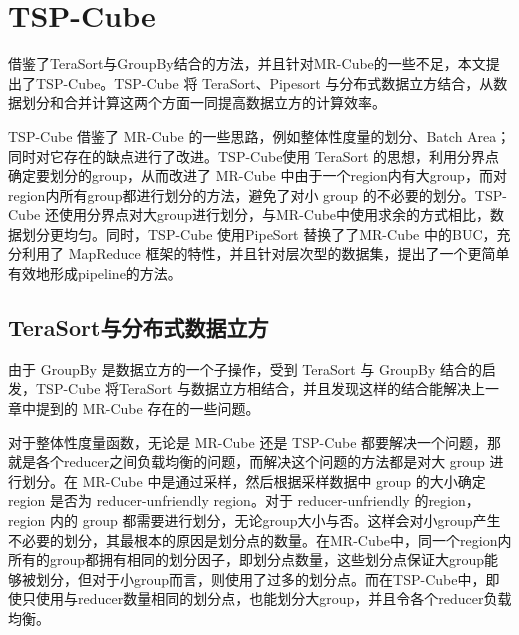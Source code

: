\section{TSP-Cube}

借鉴了TeraSort与GroupBy结合的方法，并且针对MR-Cube的一些不足，本文提出了TSP-Cube。TSP-Cube 将 TeraSort、Pipesort 与分布式数据立方结合，从数据划分和合并计算这两个方面一同提高数据立方的计算效率。

TSP-Cube 借鉴了 MR-Cube 的一些思路，例如整体性度量的划分、Batch Area；同时对它存在的缺点进行了改进。TSP-Cube使用 TeraSort 的思想，利用分界点确定要划分的group，从而改进了 MR-Cube 中由于一个region内有大group，而对region内所有group都进行划分的方法，避免了对小 group 的不必要的划分。TSP-Cube 还使用分界点对大group进行划分，与MR-Cube中使用求余的方式相比，数据划分更均匀。同时，TSP-Cube 使用PipeSort 替换了了MR-Cube 中的BUC，充分利用了 MapReduce 框架的特性，并且针对层次型的数据集，提出了一个更简单有效地形成pipeline的方法。

\subsection{TeraSort与分布式数据立方}


由于 GroupBy 是数据立方的一个子操作，受到 TeraSort 与 GroupBy 结合的启发，TSP-Cube 将TeraSort 与数据立方相结合，并且发现这样的结合能解决上一章中提到的 MR-Cube 存在的一些问题。



对于整体性度量函数，无论是 MR-Cube 还是 TSP-Cube 都要解决一个问题，那就是各个reducer之间负载均衡的问题，而解决这个问题的方法都是对大 group 进行划分。在 MR-Cube 中是通过采样，然后根据采样数据中 group 的大小确定 region 是否为 reducer-unfriendly region。对于 reducer-unfriendly 的region，region 内的 group 都需要进行划分，无论group大小与否。这样会对小group产生不必要的划分，其最根本的原因是划分点的数量。在MR-Cube中，同一个region内所有的group都拥有相同的划分因子，即划分点数量，这些划分点保证大group能够被划分，但对于小group而言，则使用了过多的划分点。而在TSP-Cube中，即使只使用与reducer数量相同的划分点，也能划分大group，并且令各个reducer负载均衡。


